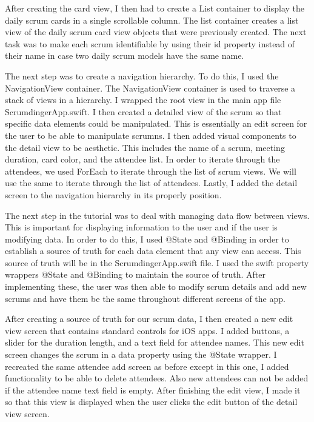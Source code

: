 \documentclass[10pt,twocolumn]{article}
\begin{document}
After creating the card view, I then had to create a List container to display the daily scrum cards in a single scrollable column. The list container creates a list view of the daily scrum card view objects that were previously created. The next task was to make each scrum identifiable by using their id property instead of their name in case two daily scrum models have the same name. 

The next step was to create a navigation hierarchy. To do this, I used the NavigationView container. The NavigationView container is used to traverse a stack of views in a hierarchy. I wrapped the root view in the main app file ScrumdingerApp.swift. I then created a detailed view of the scrum so that specific data elements could be manipulated. This is essentially an edit screen for the user to be able to manipulate scrumns. I then added visual components to the detail view to be aesthetic. This includes the name of a scrum, meeting duration, card color, and the attendee list. In order to iterate through the attendees, we used ForEach to iterate through the list of scrum views. We will use the same to iterate through the list of attendees. Lastly, I added the detail screen to the navigation hierarchy in its properly position.  

The next step in the tutorial was to deal with managing data flow between views. This is important for displaying information to the user and if the user is modifying data. In order to do this, I used @State and @Binding in order to establish a source of truth for each data element that any view can access. This source of truth will be in the ScrumdingerApp.swift file. I used the swift property wrappers @State and @Binding to maintain the source of truth. After implementing these, the user was then able to modify scrum details and add new scrums and have them be the same throughout different screens of the app.

After creating a source of truth for our scrum data, I then created a new edit view screen that contains standard controls for iOS apps. I added buttons, a slider for the duration length, and a text field for attendee names. This new edit screen changes the scrum in a data property using the @State wrapper. I recreated the same attendee add screen as before except in this one, I added functionality to be able to delete attendees. Also new attendees can not be added if the attendee name text field is empty. After finishing the edit view, I made it so that this view is displayed when the user clicks the edit button of the detail view screen. 
\end{document}
